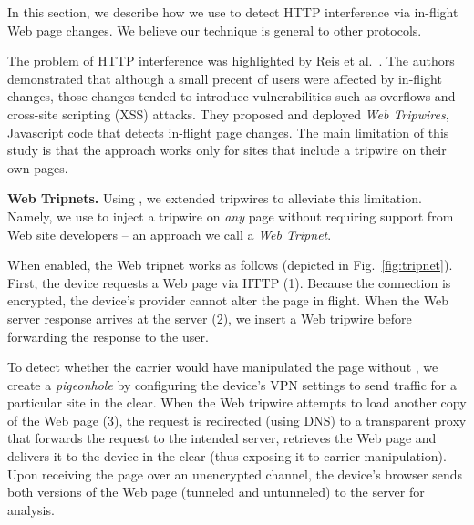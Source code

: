 In this section, we describe how we use \meddle to detect HTTP interference via 
in-flight Web page changes. We believe our technique 
is general to other protocols. 

The problem of HTTP interference was highlighted 
by Reis et al.~\cite{reis:tripwires}. The authors demonstrated that although a small 
precent of users were affected by in-flight changes, those changes tended to introduce 
vulnerabilities such as overflows and cross-site scripting (XSS) attacks. They proposed and deployed 
\emph{Web Tripwires}, Javascript code that detects in-flight page changes. The main 
limitation of this study is that the approach works only for sites that include a tripwire on their 
own pages.

\noindent\textbf{Web Tripnets.} Using \meddle, we extended tripwires to alleviate this 
limitation. Namely, we use \meddle to inject a tripwire on \emph{any} page without requiring 
support from Web site developers -- an approach we call a \emph{Web Tripnet}.

When enabled, the Web tripnet works as follows (depicted in Fig.~\ref{fig:tripnet}). First, the device requests a Web page via 
HTTP (1). Because the \meddle connection is encrypted, the device's 
provider cannot alter the page in flight. When the Web server response arrives at 
the \meddle server (2), we insert a Web tripwire before forwarding the response to the user. 

To detect whether the carrier would have manipulated the 
page without \meddle, we create a \emph{pigeonhole} by configuring the device's VPN settings to send 
traffic for a particular site in the clear. When the Web tripwire attempts to load another copy 
of the Web page (3), the request is redirected (using DNS) to a transparent proxy that forwards the request to the intended server, 
retrieves the Web page and delivers it to the device in the clear (thus exposing it to carrier manipulation). 
Upon receiving the page over an unencrypted channel, the device's browser sends both 
versions of the Web page (tunneled and untunneled) to the \meddle server for analysis. 

